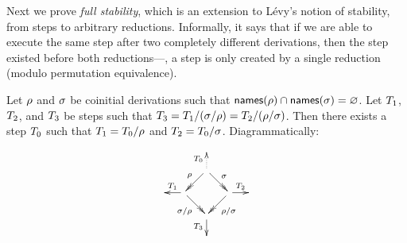 Next we prove \emph{full stability}, which is an extension to Lévy's notion of
stability, from steps to arbitrary reductions. Informally, it says that if we are able
to execute the same step after two completely different derivations,
then the step existed before
both reductions---\ie, a step is only created by a single reduction (modulo permutation
equivalence).

\begin{lemma}
Let $\rho$ and $\sigma$ be coinitial derivations such that
$\mathsf{names}(\rho) \cap \mathsf{names}(\sigma) = \varnothing$.
Let $T_1$, $T_2$, and $T_3$
be steps such that
$T_3 = T_1/(\sigma/\rho) = T_2/(\rho/\sigma)$.
Then there exists a step $T_0$ such that
$T_1 = T_0/\rho$ and $T_2 = T_0/\sigma$.
Diagrammatically:
\[
  \xymatrix@R=.5cm@C=.5cm{
    &&&
  \\
    &
    & \ar@{.>}[u]^{\redexthree_0} \ar@{->>}[ld]_{\redseq} \ar@{->>}[rd]^{\redseqtwo} &
  \\
    &
    \ar[l]_{\redexthree_1}
    \ar@{->>}[rd]_{\redseqtwo/\redseq} & & \ar@{->>}[ld]^{\redseq/\redseqtwo} \ar[r]^{\redexthree_2}
    &
  \\
    &
    &
    \ar[d]_{\redexthree_3}
    &
  \\
    &&&
  }
\]
\end{lemma}
